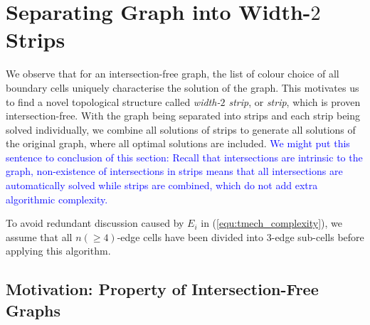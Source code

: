\documentclass[conference]{IEEEtran}
\begin{document}



\section{Separating Graph into Width-$2$ Strips}
\label{section_graph_separation}
We observe that for an intersection-free graph, the list of colour choice of all boundary cells uniquely characterise the solution of the graph. 
This motivates us to find a novel topological structure called \textit{width-$2$ strip}, or \textit{strip}, which is proven intersection-free. 
With the graph being separated into strips and each strip being solved individually, we combine all solutions of strips to generate all solutions of the original graph, where all optimal solutions are included. 
\textcolor{blue}{We might put this sentence to conclusion of this section: 
Recall that intersections are intrinsic to the graph, non-existence of intersections in strips means that all intersections are automatically solved while strips are combined, which do not add extra algorithmic complexity. 
}

To avoid redundant discussion caused by $E_i$ in (\ref{equ:tmech_complexity}), we assume that all $n(\geq 4)$-edge cells have been divided into $3$-edge sub-cells before applying this algorithm. 

\subsection{Motivation: Property of Intersection-Free Graphs}
\end{document}
